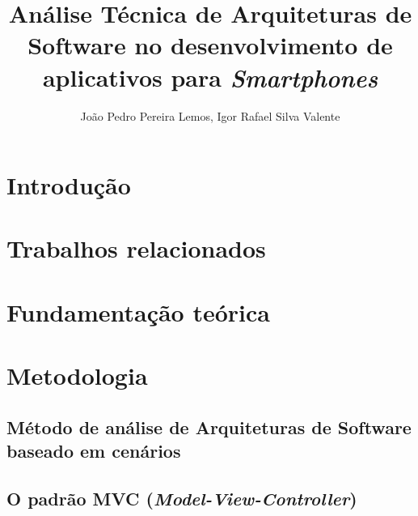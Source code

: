\documentclass[12pt]{article}
\title{Análise Técnica de Arquiteturas de Software no desenvolvimento de aplicativos para \emph{Smartphones}}
\author{João Pedro Pereira Lemos\inst{1}, Igor Rafael Silva Valente\inst{1}}
\begin{document}
 

\maketitle

\begin{abstract}
  
\end{abstract}
     
\begin{resumo}
  
\end{resumo}


\section{Introdução}






\section{Trabalhos relacionados}








\section{Fundamentação teórica}




\section{Metodologia}



\subsection{Método de análise de Arquiteturas de Software baseado em cenários}



\subsection{O padrão MVC (\emph{Model-View-Controller})}
\end{document}
